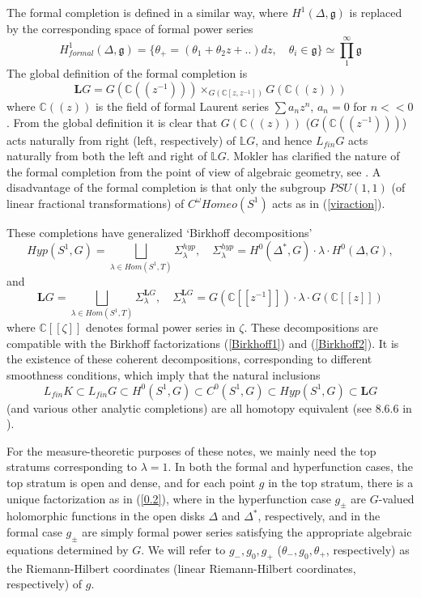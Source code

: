 \documentclass{amsart}
\theoremstyle{conjecture}
\theoremstyle{definition}
\theoremstyle{question}
\theoremstyle{questions}
\theoremstyle{remark}
\theoremstyle{remarks}
\theoremstyle{example}
\numberwithin{equation}{section}
\begin{document}
The formal completion is defined in a similar way, where
$H^1(\Delta ,\mathfrak g)$ is replaced by the corresponding space
of formal power series
$$H^1_{formal}(\Delta ,\mathfrak g)=\{\theta_{+}=(\theta_1+\theta_2z+
..)dz,\quad\theta_i\in \mathfrak
g\}\simeq\prod_1^{\infty}\mathfrak g$$
The global definition of
the formal completion is
$$\mathbf LG=G(\mathbb C((z^{-1})))\times_{G(\mathbb C[z,z^{-1}])}G(
\mathbb C((z)))$$ where $\mathbb C((z))$ is the field of formal
Laurent series $\sum a_nz^n$, $a_n=0$ for $n<<0$. From the global
definition it is clear that $G(\mathbb C((z)))$ ($G(\mathbb C((z^{-1})))$)
acts naturally
from right (left, respectively) of $\mathbb L G$, and hence $L_{fin}G$ acts naturally
from both the left and right of $\mathbb L G$.
Mokler has clarified the nature of the formal completion from the point of
view of algebraic geometry, see \cite{Mokler}. A disadvantage of the formal completion
is that only the subgroup $PSU(1,1)$ (of linear fractional transformations) of $C^{\omega}Homeo(S^1)$
acts as in (\ref{viraction}).

These completions have generalized `Birkhoff decompositions'
$$Hyp(S^1,G)=\bigsqcup_{\lambda\in Hom(S^1,T)}\Sigma^{hyp}_{\lambda},\quad\Sigma_{
\lambda}^{hyp}=H^0(\Delta^{*},G)\cdot\lambda\cdot H^0(\Delta
,G),$$ and
$$\mathbf LG=\bigsqcup_{\lambda\in Hom(S^1,T)}\Sigma_{\lambda}^{\mathbf LG},\quad
\Sigma_{\lambda}^{\mathbf LG}=G(\mathbb
C[[z^{-1}]])\cdot\lambda\cdot G(\mathbb C[[z]])$$ where $\mathbb
C[[\zeta ]]$ denotes formal power series in $\zeta$. These decompositions are compatible with the Birkhoff factorizations
(\ref{Birkhoff1}) and (\ref{Birkhoff2}). It is the existence of
these coherent decompositions, corresponding to different
smoothness conditions, which imply that the natural inclusions
$$L_{fin}K\subset L_{fin}G\subset H^0(S^1,G) \subset C^0(S^1,G)\subset Hyp(S^1,G)\subset \mathbf L G$$
(and various other analytic completions) are all homotopy equivalent (see 8.6.6 in \cite{PS}).

For the measure-theoretic purposes of these notes, we mainly need the top
stratums corresponding to $\lambda=1$.
In both the formal and hyperfunction cases, the top stratum is open and dense,
and for each point $g$ in the top stratum, there is a unique factorization as
in (\ref{0.2}), where in the hyperfunction case $g_{\pm}$ are
$G$-valued holomorphic functions in the open disks $\Delta$
and $\Delta^{*}$, respectively, and in the formal case $g_{\pm}$
are simply formal power series satisfying the appropriate
algebraic equations determined by $G$.  We will refer to
$g_{-},g_0,g_{+}$ ($\theta_{ -},g_0,\theta_{+}$, respectively) as
the Riemann-Hilbert coordinates (linear Riemann-Hilbert
coordinates, respectively) of $g$.
\end{document}
